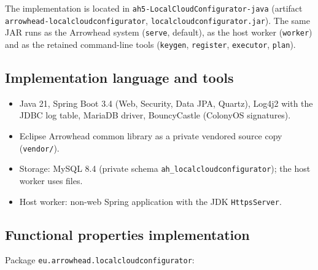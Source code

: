 \documentclass[a4paper]{arrowhead}
\begin{document}
The implementation is located in \texttt{ah5-LocalCloudConfigurator-java} (artifact \texttt{arrowhead-\allowbreak{}localcloudconfigurator}, \texttt{localcloudconfigurator.\allowbreak{}jar}). The same JAR runs as the Arrowhead system (\texttt{serve}, default), as the host worker (\texttt{worker}) and as the retained command-line tools (\texttt{keygen}, \texttt{register}, \texttt{executor}, \texttt{plan}).

\subsection{Implementation language and tools}
\begin{itemize}
\item Java 21, Spring Boot 3.4 (Web, Security, Data JPA, Quartz), Log4j2 with the JDBC log table, MariaDB driver, BouncyCastle (ColonyOS signatures).
\item Eclipse Arrowhead common library as a private vendored source copy (\texttt{vendor/}).
\item Storage: MySQL 8.4 (private schema \texttt{ah\_\allowbreak{}localcloudconfigurator}); the host worker uses files.
\item Host worker: non-web Spring application with the JDK \texttt{HttpsServer}.
\end{itemize}

\subsection{Functional properties implementation}

Package \texttt{eu.\allowbreak{}arrowhead.\allowbreak{}localcloudconfigurator}:
\end{document}
